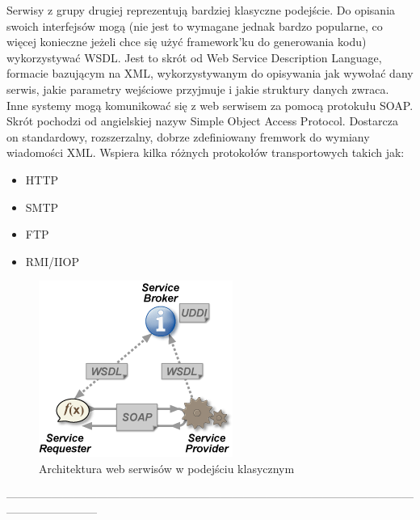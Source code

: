 Serwisy z grupy drugiej reprezentują bardziej klasyczne podejście. Do opisania swoich interfejsów mogą (nie jest to wymagane jednak bardzo popularne, co więcej konieczne jeżeli chce się użyć framework'ku do generowania kodu) wykorzystywać WSDL. Jest to skrót od Web Service Description Language, formacie bazującym na XML, wykorzystywanym do opisywania jak wywołać dany serwis, jakie parametry wejściowe przyjmuje i jakie struktury danych zwraca. Inne systemy mogą komunikować się z web serwisem za pomocą protokułu SOAP. Skrót pochodzi od angielskiej nazyw Simple Object Access Protocol. Dostarcza on standardowy, rozszerzalny, dobrze zdefiniowany fremwork do wymiany wiadomości XML. Wspiera kilka różnych protokołów transportowych takich jak:
 \begin{itemize}
	\item HTTP
	\item SMTP
	\item FTP
	\item RMI/IIOP
\end{itemize}  
\newpage
\begin{figure}[!h]
	\centering
	\includegraphics[scale=0.75]{webSerwisyArchitektura.png} 
	\caption{Architektura web serwisów w podejściu klasycznym}
\end{figure}
------------------------------------------------------------------------------------------------------------------------------------

